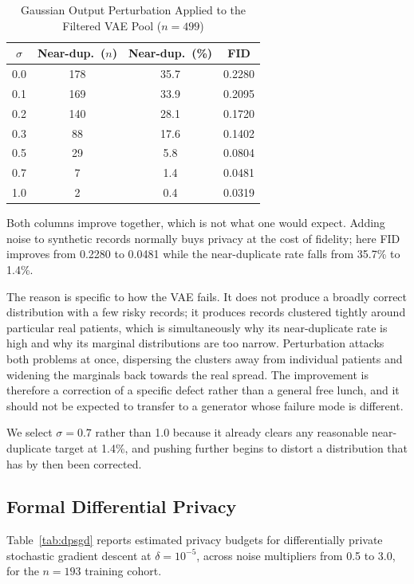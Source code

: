 \documentclass[journal,onecolumn]{IEEEtran}
\begin{document}
\begin{table}[!t]
  \centering
  \caption{Gaussian Output Perturbation Applied to the Filtered VAE Pool ($n = 499$)}
  \label{tab:perturb}
  \begin{tabular}{cccc}
    \toprule
    $\sigma$ & Near-dup.\ ($n$) & Near-dup.\ (\%) & FID \\
    \midrule
    0.0 & 178 & 35.7 & 0.2280 \\
    0.1 & 169 & 33.9 & 0.2095 \\
    0.2 & 140 & 28.1 & 0.1720 \\
    0.3 & 88 & 17.6 & 0.1402 \\
    0.5 & 29 & 5.8 & 0.0804 \\
    0.7 & 7 & 1.4 & 0.0481 \\
    1.0 & 2 & 0.4 & 0.0319 \\
    \bottomrule
  \end{tabular}
\end{table}

Both columns improve together, which is not what one would expect. Adding noise to synthetic records normally buys privacy at the cost of fidelity; here FID improves from 0.2280 to 0.0481 while the near-duplicate rate falls from 35.7\% to 1.4\%.

The reason is specific to how the VAE fails. It does not produce a broadly correct distribution with a few risky records; it produces records clustered tightly around particular real patients, which is simultaneously why its near-duplicate rate is high and why its marginal distributions are too narrow. Perturbation attacks both problems at once, dispersing the clusters away from individual patients and widening the marginals back towards the real spread. The improvement is therefore a correction of a specific defect rather than a general free lunch, and it should not be expected to transfer to a generator whose failure mode is different.

We select $\sigma = 0.7$ rather than 1.0 because it already clears any reasonable near-duplicate target at 1.4\%, and pushing further begins to distort a distribution that has by then been corrected.

\subsection{Formal Differential Privacy}

Table~\ref{tab:dpsgd} reports estimated privacy budgets for differentially private stochastic gradient descent at $\delta = 10^{-5}$, across noise multipliers from 0.5 to 3.0, for the $n = 193$ training cohort.
\end{document}
